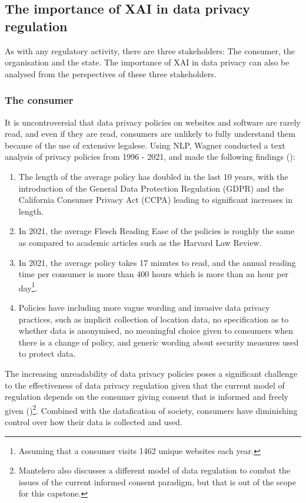 \subsection{The importance of XAI in data privacy regulation}
As with any regulatory activity, there are three stakeholders: The consumer, the organisation and the state. The importance of XAI in data privacy can also be analysed from the perspectives of these three stakeholders.

\subsubsection{The consumer}
It is uncontroversial that data privacy policies on websites and software are rarely read, and even if they are read, consumers are unlikely to fully understand them because of the use of extensive legalese. Using NLP, Wagner conducted a text analysis of privacy policies from 1996 - 2021, and made the following findings (\cite{wagner2022privacy}): 

\begin{enumerate}
  \item The length of the average policy has doubled in the last 10 years, with the introduction of the General Data Protection Regulation (GDPR) and the California Consumer Privacy Act (CCPA) leading to significant increases in length.
  \item In 2021, the average Flesch Reading Ease of the policies is roughly the same as compared to academic articles such as the Harvard Law Review.
  \item In 2021, the average policy takes 17 minutes to read, and the annual reading time per consumer is more than 400 hours which is more than an hour per day\footnote{Assuming that a consumer visits 1462 unique websites each year.}.
  \item Policies have including more vague wording and invasive data privacy practices, such as implicit collection of location data, no specification as to whether data is anonymised, no meaningful choice given to consumers when there is a change of policy, and generic wording about security measures used to protect data.
\end{enumerate}

The increasing unreadability of data privacy policies poses a significant challenge to the effectiveness of data privacy regulation given that the current model of regulation depends on the consumer giving consent that is informed and freely given (\cite{mantelero_2014})\footnote{Mantelero also discusses a different model of data regulation to combat the issues of the current informed consent paradigm, but that is out of the scope for this capstone.}. Combined with the datafication of society, consumers have diminishing control over how their data is collected and used. 

